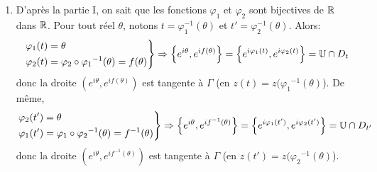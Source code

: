 \begin{enumerate}
\item D'après la partie I, on sait que les fonctions $\varphi_1$ et $\varphi_2$ sont bijectives de $\mathbb{R}$ dans $\mathbb{R}$. Pour tout réel $\theta$, notons $t = \varphi_1^{-1}(\theta)$ et $t' = \varphi_2^{-1}(\theta)$. Alors:
\[
  \left.
  \begin{aligned}
 \varphi_1(t) &= \theta \\ \varphi_2(t) &= \varphi_2 \circ {\varphi_1}^{-1}(\theta) = f(\theta)   
  \end{aligned}
 \right\rbrace
  \Rightarrow \left\lbrace e^{i\theta}, e^{if(\theta)}\right\rbrace = \left\lbrace e^{i\varphi_1(t)}, e^{i\varphi_2(t)}\right\rbrace = \mathbb{U} \cap D_t
\]
donc la droite $\left( e^{i\theta}, e^{if(\theta)}\right)$ est tangente à $\Gamma$ (en $z(t) = z({\varphi_1}^{-1}(\theta)$). De même,
\[
  \left.
  \begin{aligned}
 \varphi_2(t') &= \theta \\ \varphi_1(t') &= \varphi_1 \circ {\varphi_2}^{-1}(\theta) = f^{-1}(\theta)   
  \end{aligned}
 \right\rbrace
  \Rightarrow \left\lbrace e^{i\theta}, e^{if^{-1}(\theta)}\right\rbrace = \left\lbrace e^{i\varphi_1(t')}, e^{i\varphi_2(t')}\right\rbrace = \mathbb{U} \cap D_{t'}
\]
donc la droite $\left( e^{i\theta}, e^{if^{-1}(\theta)}\right)$ est tangente à $\Gamma$ (en $z(t')= z({\varphi_2}^{-1}(\theta)$).


\end{enumerate}
